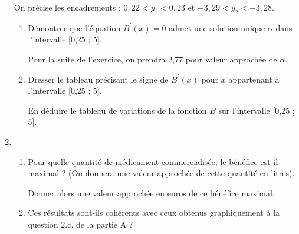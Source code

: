 \begin{enumerate}
\begin{center}
\begin{extern}
{\begin{tikzpicture}[scale=.8, line width=.5pt, dark]
       \end{tikzpicture}
      }
   \end{extern}
\end{center}
On précise les encadrements : $0,22 < y_{1} < 0,23$ et $-3,29 < y_{2}  < -3,28$.
     \begin{enumerate}[label=\alph*.] 
          \item
          Démontrer que l'équation $B^{\prime}\left(x\right)=0$ admet une solution unique $\alpha $ dans l'intervalle [0,25 ; 5].
          \par
          Pour la suite de l'exercice, on prendra 2,77 pour valeur approchée de $\alpha $.
          \item
          Dresser le tableau précisant le signe de $B^{\prime}\left(x\right)$ pour $x$ appartenant à l'intervalle [0,25 ; 5].
          \par
          En déduire le tableau de variations de la fonction $B$ sur l'intervalle [0,25 ; 5].
     \end{enumerate}
     \item
     \begin{enumerate}[label=\alph*.] 
          \item
          Pour quelle quantité de médicament commercialisée, le bénéfice est-il maximal ? (On donnera une valeur approchée de cette quantité en litres).
          \par
          Donner alors une valeur approchée en euros de ce bénéfice maximal.
          \item
          Ces résultats sont-ils cohérents avec ceux obtenus graphiquement à la question 2.c. de la partie A ?
     \end{enumerate}
\end{enumerate}
